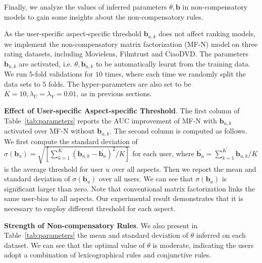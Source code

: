 \documentclass[letterpaper]{article} %
\begin{document}
Finally, we analyze the values of inferred parameters $\theta,\mathbf{b}$ in non-compensatory models to gain some insights about the non-compensatory rules. 

As the user-specific aspect-specific threshold $\mathbf{b}_{u,k}$ does not affect ranking models, we implement the non-compensatory matrix factorization (MF-N) model on three rating datasets, including Movielens, Filmtrust and CiaoDVD. The parameters $\mathbf{b}_{u,k}$ are activated, i.e. $\theta,\mathbf{b}_{u,k}$ to be automatically learnt from the training data. We run 5-fold validations for $10$ times, where each time we randomly split the data sets to $5$ folds. The hyper-parameters are also set to be $K=10, \lambda_U=\lambda_V=0.01$, as in previous sections.

\textbf{Effect of User-specific Aspect-specific Threshold}. The first column of Table~\ref{tab:parameters} reports the AUC improvement of MF-N with $\mathbf{b}_{u,k}$ activated over MF-N without $\mathbf{b}_{u,k}$. The second column is computed as follows. We first compute the standard deviation of $\sigma(\mathbf{b}_{u})=\sqrt {[\sum_{k=1}^{K} (\mathbf{b}_{u,k}-\bar{\mathbf{b}_u})^2 /K]} $ for each user, where $\bar{\mathbf{b}_u}=\sum_{k=1}^K \mathbf{b}_{u,k} /K$ is the average threshold for user $u$ over all aspects. Then we report the mean and standard deviation of $\sigma(\mathbf{b}_{u})$ over all users. We can see that $\sigma(\mathbf{b}_{u})$ is significant larger than zero. Note that conventional matrix factorization links the same user-bias to all aspects. Our experimental result demonstrates that it is necessary to employ different threshold for each aspect. 

\textbf{Strength of Non-compensatory Rules}. We also present in Table~\ref{tab:parameters} the mean and standard deviation of $\theta$ inferred on each dataset. We can see that the optimal value of $\theta$ is moderate, indicating the users adopt a combination of lexicographical rules and conjunctive rules.  

\begin{table}[htp]
\caption{AUC improvements with $\mathbf{b}$ activated, scale of parameters $\mathbf{b}_{u,k}$ and $\theta$.}
\centering
{}
\label{tab:parameters}
\end{table}
\end{document}

